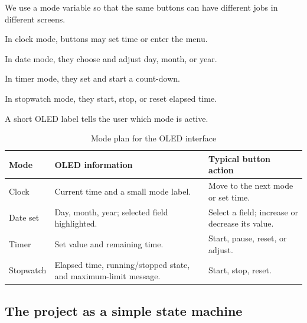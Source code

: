 \documentclass[12pt,letterpaper]{article}
\begin{document}
We use a mode variable so that the same buttons
can have different jobs in different screens.

In clock mode,
buttons may set time or enter the menu.

In date mode,
they choose and adjust day,
month, or year.

In timer mode,
they set and start a count-down.

In stopwatch mode,
they start,
stop,
or reset elapsed time.

A short OLED label tells the user
which mode is active.

\begin{table}[H]

  \centering

  \caption{Mode plan for the OLED interface}

  \label{tab:modes}

  \begin{tabularx}{
    \textwidth
  }{
    @{}p{30mm}Y Y@{}
  }

    \toprule

    \textbf{Mode}
    &
    \textbf{OLED information}
    &
    \textbf{Typical button action}
    \\

    \midrule

    Clock
    &
    Current time and a small mode label.
    &
    Move to the next mode or set time.
    \\

    Date set
    &
    Day, month, year;
    selected field highlighted.
    &
    Select a field;
    increase or decrease its value.
    \\

    Timer
    &
    Set value and remaining time.
    &
    Start, pause, reset, or adjust.
    \\

    Stopwatch
    &
    Elapsed time, running/stopped state, and maximum-limit message.
    &
    Start, stop, reset.
    \\

    \bottomrule

  \end{tabularx}

\end{table}

\subsection*{The project as a simple state machine}
\end{document}

